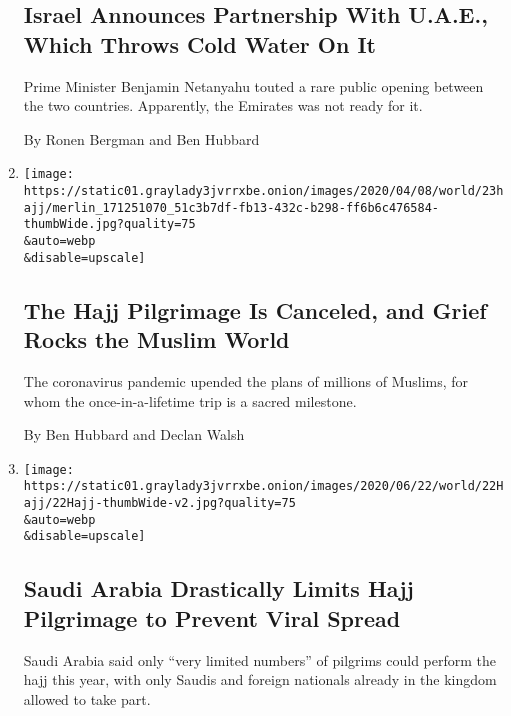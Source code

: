 \begin{enumerate}
  \hypertarget{israel-announces-partnership-with-uae-which-throws-cold-water-on-it}{%
  \subsection{Israel Announces Partnership With U.A.E., Which Throws
  Cold Water On
  It}\label{israel-announces-partnership-with-uae-which-throws-cold-water-on-it}}

  Prime Minister Benjamin Netanyahu touted a rare public opening between
  the two countries. Apparently, the Emirates was not ready for it.

  By Ronen Bergman and Ben Hubbard
\item
  \href{/2020/06/23/world/middleeast/hajj-pilgrimage-canceled.html}{}

  \texttt{[image: https://static01.graylady3jvrrxbe.onion/images/2020/04/08/world/23hajj/merlin\_171251070\_51c3b7df-fb13-432c-b298-ff6b6c476584-thumbWide.jpg?quality=75\\\&auto=webp\\\&disable=upscale]}

  \hypertarget{the-hajj-pilgrimage-is-canceled-and-grief-rocks-the-muslim-world}{%
  \subsection{The Hajj Pilgrimage Is Canceled, and Grief Rocks the
  Muslim
  World}\label{the-hajj-pilgrimage-is-canceled-and-grief-rocks-the-muslim-world}}

  The coronavirus pandemic upended the plans of millions of Muslims, for
  whom the once-in-a-lifetime trip is a sacred milestone.

  By Ben Hubbard and Declan Walsh
\item
  \href{/2020/06/22/world/middleeast/saudi-arabia-hajj-mecca-pilgrims.html}{}

  \texttt{[image: https://static01.graylady3jvrrxbe.onion/images/2020/06/22/world/22Hajj/22Hajj-thumbWide-v2.jpg?quality=75\\\&auto=webp\\\&disable=upscale]}

  \hypertarget{saudi-arabia-drastically-limits-hajj-pilgrimage-to-prevent-viral-spread}{%
  \subsection{Saudi Arabia Drastically Limits Hajj Pilgrimage to Prevent
  Viral
  Spread}\label{saudi-arabia-drastically-limits-hajj-pilgrimage-to-prevent-viral-spread}}

  Saudi Arabia said only ``very limited numbers'' of pilgrims could
  perform the hajj this year, with only Saudis and foreign nationals
  already in the kingdom allowed to take part.


\end{enumerate}
